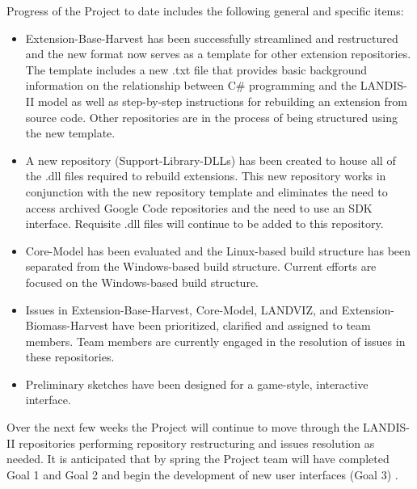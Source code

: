 \documentclass[letterpaper,11pt]{texMemo}
\begin{document}
Progress of the Project to date includes the following general and specific items:
\begin{itemize}
  \item Extension-Base-Harvest has been successfully streamlined and restructured and the new format now serves as a template for other extension repositories. The template includes a new .txt file that provides basic background information on the relationship between C\# programming and the LANDIS-II model as well as step-by-step instructions for rebuilding an extension from source code. Other repositories are in the process of being structured using the new template.
  \item  A new repository (Support-Library-DLLs) has been created to house all of the .dll files required to rebuild extensions. This new repository works in conjunction with the new repository template and eliminates the need to access archived Google Code repositories and the need to use an SDK interface. Requisite .dll files will continue to be added to this repository. 
  \item Core-Model has been evaluated and the Linux-based build structure has been separated from the Windows-based build structure. Current efforts are focused on the Windows-based build structure.
  \item Issues in Extension-Base-Harvest, Core-Model, LANDVIZ, and Extension-Biomass-Harvest have been prioritized, clarified and assigned to team members. Team members are currently engaged in the resolution of issues in these repositories.
  \item Preliminary sketches have been designed for a game-style, interactive interface.
\end{itemize}

Over the next few weeks the Project will continue to move through the LANDIS-II repositories performing repository restructuring and issues resolution as needed. It is anticipated that by spring the Project team will have completed Goal 1 and Goal 2 and begin the development of new user interfaces (Goal 3) .\\
\end{document}

